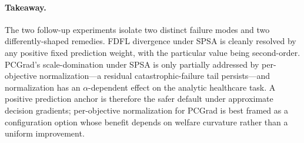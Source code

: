 \paragraph{Takeaway.}
The two follow-up experiments isolate two distinct failure modes
and two differently-shaped remedies. FDFL divergence under SPSA is
cleanly resolved by any positive fixed prediction weight, with the
particular value being second-order. PCGrad's scale-domination
under SPSA is only partially addressed by per-objective
normalization---a residual catastrophic-failure tail persists---and
normalization has an $\alpha$-dependent effect on the analytic
healthcare task. A positive prediction anchor is therefore the
safer default under approximate decision gradients; per-objective
normalization for PCGrad is best framed as a configuration option
whose benefit depends on welfare curvature rather than a uniform
improvement.
